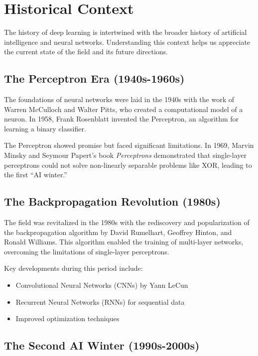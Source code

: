 
\section{Historical Context}
\label{sec:historical-context}

The history of deep learning is intertwined with the broader history of artificial intelligence and neural networks. Understanding this context helps us appreciate the current state of the field and its future directions.

\subsection{The Perceptron Era (1940s-1960s)}

The foundations of neural networks were laid in the 1940s with the work of Warren McCulloch and Walter Pitts, who created a computational model of a neuron. In 1958, Frank Rosenblatt invented the Perceptron, an algorithm for learning a binary classifier.

The Perceptron showed promise but faced significant limitations. In 1969, Marvin Minsky and Seymour Papert's book \emph{Perceptrons} demonstrated that single-layer perceptrons could not solve non-linearly separable problems like XOR, leading to the first ``AI winter.''

\subsection{The Backpropagation Revolution (1980s)}

The field was revitalized in the 1980s with the rediscovery and popularization of the backpropagation algorithm by David Rumelhart, Geoffrey Hinton, and Ronald Williams. This algorithm enabled the training of multi-layer networks, overcoming the limitations of single-layer perceptrons.

Key developments during this period include:
\begin{itemize}
    \item Convolutional Neural Networks (CNNs) by Yann LeCun
    \item Recurrent Neural Networks (RNNs) for sequential data
    \item Improved optimization techniques
\end{itemize}

\subsection{The Second AI Winter (1990s-2000s)}

